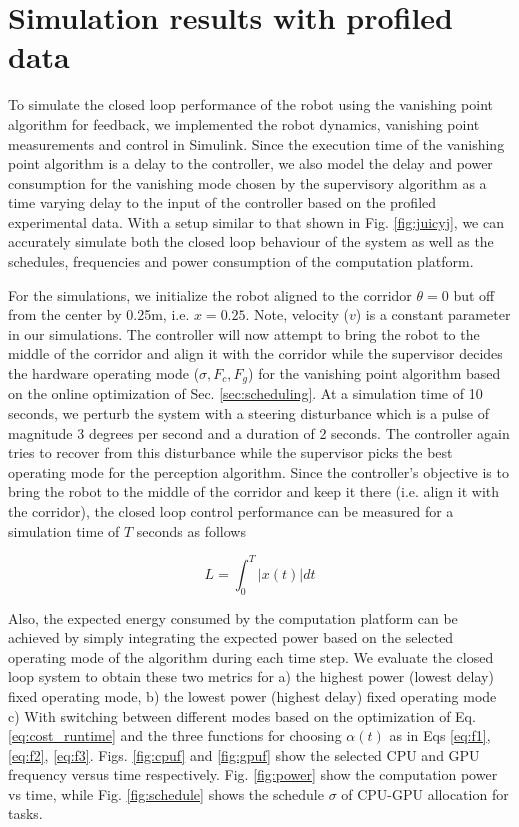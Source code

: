 \section{Simulation results with profiled data}
\label{sec:simResults}

To simulate the closed loop performance of the robot using the vanishing point algorithm for feedback, we implemented the robot dynamics, vanishing point measurements and control in Simulink. Since the execution time of the vanishing point algorithm is a delay to the controller, we also model the delay and power consumption for the vanishing mode chosen by the supervisory algorithm as a time varying delay to the input of the controller based on the profiled experimental data. With a setup similar to that shown in Fig. \ref{fig:juicyj}, we can accurately simulate both the closed loop behaviour of the system as well as the schedules, frequencies and power consumption of the computation platform.

For the simulations, we initialize the robot aligned to the corridor $\theta=0$ but off from the center by 0.25m, i.e. $x=0.25$. Note, velocity ($v$) is a constant parameter in our simulations. The controller will now attempt to bring the robot to the middle of the corridor and align it with the corridor while the supervisor decides the hardware operating mode ($\sigma,F_c,F_g$) for the vanishing point algorithm based on the online optimization of Sec. \ref{sec:scheduling}. At a simulation time of 10 seconds, we perturb the system with a steering disturbance which is a pulse of magnitude 3 degrees per second and a duration of 2 seconds. The controller again tries to recover from this disturbance while the supervisor picks the best operating mode for the perception algorithm. Since the controller's objective is to bring the robot to the middle of the corridor and keep it there (i.e. align it with the corridor), the closed loop control performance can be measured for a simulation time of $T$ seconds as follows

\begin{equation}
L = \int_0^T |x(t)|dt
\label{eq:ControlPerf}
\end{equation}

Also, the expected energy consumed by the computation platform can be achieved by simply integrating the expected power based on the selected operating mode of the algorithm during each time step. We evaluate the closed loop system to obtain these two metrics for a) the highest power (lowest delay) fixed operating mode, b) the lowest power (highest delay) fixed operating mode c) With switching between different modes based on the optimization of Eq.\ref{eq:cost_runtime} and the three functions for choosing $\alpha(t)$ as in Eqs \ref{eq:f1}, \ref{eq:f2}, \ref{eq:f3}. Figs. \ref{fig:cpuf} and \ref{fig:gpuf} show the selected CPU and GPU frequency versus time respectively. Fig. \ref{fig:power} show the computation power vs time, while Fig. \ref{fig:schedule} shows the schedule $\sigma$ of CPU-GPU allocation for tasks.


